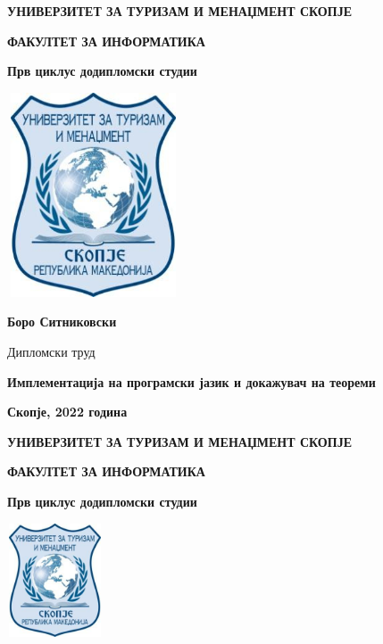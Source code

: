 \setlength{\parskip}{0.14in}

\begin{center}

\textbf{УНИВЕРЗИТЕТ ЗА ТУРИЗАМ И МЕНАЏМЕНТ СКОПЈЕ}

\textbf{ФАКУЛТЕТ ЗА ИНФОРМАТИКА}

\textbf{Прв циклус додипломски студии}

\bigbreak

\includegraphics[width=2.01042in,height=2.38542in]{images/utms.jpg}

\vspace{5em}

\textbf{Боро Ситниковски}

Дипломски труд

\textbf{Имплементација на програмски јазик и докажувач на теореми}

\vspace*{\fill}

\textbf{Скопје, 2022 година}

\newpage{}

\textbf{УНИВЕРЗИТЕТ ЗА ТУРИЗАМ И МЕНАЏМЕНТ СКОПЈЕ}

\textbf{ФАКУЛТЕТ ЗА ИНФОРМАТИКА}

\textbf{Прв циклус додипломски студии}

\bigbreak

\includegraphics[width=1.11458in,height=1.32292in]{images/utms.jpg}

\end{center}

